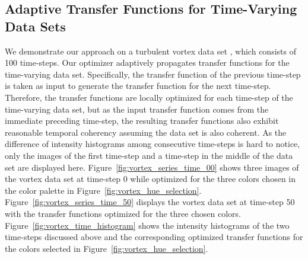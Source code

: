 \subsection{Adaptive Transfer Functions for Time-Varying Data Sets}
We demonstrate our approach on a turbulent vortex data set \cite{website:Ma_repository_2013}, which consists of 100 time-steps. Our optimizer adaptively propagates transfer functions for the time-varying data set. Specifically, the transfer function of the previous time-step is taken as input to generate the transfer function for the next time-step.
Therefore, the transfer functions are locally optimized for each time-step of the time-varying data set, but as the input transfer function comes from the immediate preceding time-step, the resulting transfer functions also exhibit reasonable temporal coherency assuming the data set is also coherent.
As the difference of intensity histograms among consecutive time-steps is hard to notice, only the images of the first time-step and a time-step in the middle of the data set are displayed here.
Figure~\ref{fig:vortex_series_time_00} shows three images of the vortex data set at time-step 0 while optimized for the three colors chosen in the color palette in Figure~\ref{fig:vortex_hue_selection}.
Figure~\ref{fig:vortex_series_time_50} displays the vortex data set at time-step 50 with the transfer functions optimized for the three chosen colors.
Figure~\ref{fig:vortex_time_histogram} shows the intensity histograms of the two time-steps discussed above and the corresponding optimized transfer functions for the colors selected in Figure~\ref{fig:vortex_hue_selection}.

